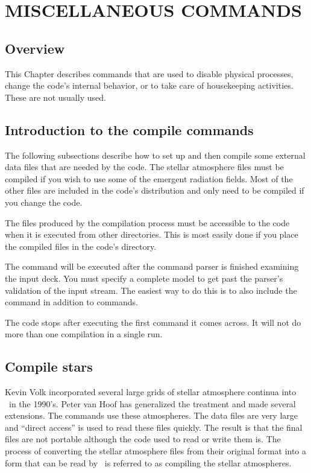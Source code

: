 \chapter{MISCELLANEOUS COMMANDS}
\label{sec:MiscellaneousCommands}

\section{Overview}

This Chapter describes commands that are used to disable physical
processes, change the code's internal behavior, or to take care of
housekeeping activities.
These are not usually used.

\section{Introduction to the compile commands}

The following subsections describe how to set up and then compile some
external data files that are needed by the code.
The stellar atmosphere
files must be compiled if you wish to use some of the
 emergent radiation fields.
Most of the other files are included in the code's distribution and only
need to be compiled if you change the code.

The files produced by the compilation process must be accessible to the
code when it is executed from other directories.
This is most easily done
if you place the compiled files in
the code's  directory.

The  command will be executed after
the command parser is finished
examining the input deck.
You must specify a complete model to get past
the parser's validation of the input stream.
The easiest way to do this
is to also include the  command
in addition to
 commands.

The code stops after executing the first 
command it comes across.
It will not do more than one compilation in a single run.

\section{Compile stars}

Kevin Volk incorporated several large grids of stellar atmosphere
continua
into \Cloudy\ in the 1990's.
Peter van Hoof has generalized the treatment
and made several extensions.
The  commands use these atmospheres.
The data files are very large and ``direct access'' is used to read these
files quickly.
The result is that the final files are not portable although
the code used to read or write them is.
The process of converting the
stellar atmosphere files from their original format into a form that can
be read by \Cloudy\ is referred to as compiling the stellar atmospheres.


